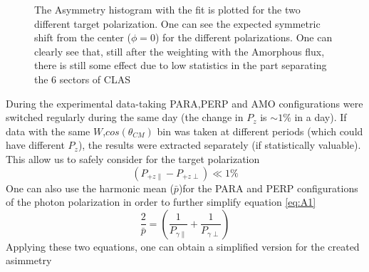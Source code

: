 \begin{figure}[htb]
  \begin{center}
    \caption{The Asymmetry histogram with the fit is plotted for the two different target polarization. One can see the expected symmetric shift from the center ($\phi = 0$) for the different polarizations.  One can clearly see that, still after the weighting with the Amorphous flux, there is still some effect due to low statistics in the part separating the 6 sectors of CLAS}
    \label{fig:GTgpol}
  \end{center}
\end{figure} 
During the experimental data-taking PARA,PERP and AMO configurations were switched regularly during the same day (the change in $P_z$ is $\sim 1\%$ in a day). If data with the same $W$,$cos(\theta_{CM})$ bin was taken at different periods (which could have different $P_z$), the results were extracted separately (if statistically valuable). This allow us to safely consider for the target polarization
\begin{equation}
  (P_{+z\parallel}-P_{+z\perp}) \ll 1 \% 
\end{equation}
One can also use the harmonic mean ($\bar{p}$)for the PARA and PERP configurations of the photon polarization in order to further simplify equation \ref{eq:A1} 
\begin{equation}
  \frac{2}{\bar{p}} = \left(\frac{1}{P_{\gamma \parallel}} + \frac{1}{P_{\gamma \perp}}\right)
\end{equation}
Applying these two equations, one can obtain a simplified version for the created asimmetry
